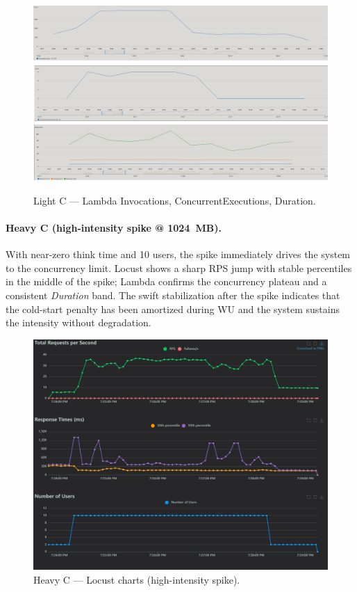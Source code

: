 \documentclass[11pt,a4paper]{article}
\begin{document}
\begin{figure}[h!] \centering
  \includegraphics[width=.32\linewidth]{"figures/lC - Invocations.png"}\hfill
  \includegraphics[width=.32\linewidth]{"figures/lC - ConcEx.png"}\hfill
  \includegraphics[width=.32\linewidth]{"figures/lC - Duration.png"}
  \caption{Light C --- Lambda Invocations, ConcurrentExecutions, Duration.}
\end{figure}

\paragraph{Heavy C (high-intensity spike @ \SI{1024}{MB}).}
With near-zero think time and 10 users, the spike immediately drives the system to the concurrency limit. Locust shows a sharp RPS jump with stable percentiles in the middle of the spike; Lambda confirms the concurrency plateau and a consistent \emph{Duration} band. The swift stabilization after the spike indicates that the cold-start penalty has been amortized during WU and the system sustains the intensity without degradation.

\begin{figure}[h!] \centering
  \includegraphics[width=\linewidth]{"figures/hC - Charts.png"}
  \caption{Heavy C --- Locust charts (high-intensity spike).}
\end{figure}
\end{document}
